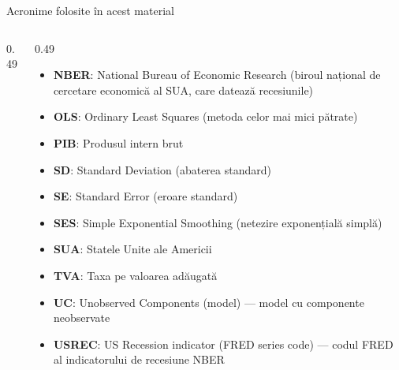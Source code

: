 \begin{frame}{Acronime folosite în acest material}
\begin{columns}[T]
\begin{column}{0.49\textwidth}
\end{column}
\begin{column}{0.49\textwidth}
\begin{itemize}\setlength{\itemsep}{0pt}
    \item \textbf{NBER}: National Bureau of Economic Research (biroul național de cercetare economică al SUA, care datează recesiunile)
    \item \textbf{OLS}: Ordinary Least Squares (metoda celor mai mici pătrate)
    \item \textbf{PIB}: Produsul intern brut
    \item \textbf{SD}: Standard Deviation (abaterea standard)
    \item \textbf{SE}: Standard Error (eroare standard)
    \item \textbf{SES}: Simple Exponential Smoothing (netezire exponențială simplă)
    \item \textbf{SUA}: Statele Unite ale Americii
    \item \textbf{TVA}: Taxa pe valoarea adăugată
    \item \textbf{UC}: Unobserved Components (model) — model cu componente neobservate
    \item \textbf{USREC}: US Recession indicator (FRED series code) — codul FRED al indicatorului de recesiune NBER
\end{itemize}
\end{column}
\end{columns}
\end{frame}

